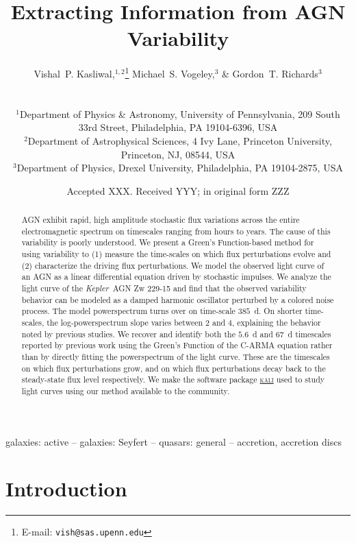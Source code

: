 \documentclass[a4paper,fleqn,usenatbib]{mnras}
\title[Extracting Information from AGN Variability]{Extracting Information from AGN Variability}
\author[V.~P. Kasliwal et al.]{
\parbox{\textwidth}{
Vishal~P. Kasliwal,$^{1,2}$\thanks{E-mail: \texttt{vish@sas.upenn.edu}}
Michael~S. Vogeley,$^{3}$
\& Gordon~T. Richards$^{3}$}\vspace{0.4cm}\
\\
\parbox{\textwidth}{
$^{1}$Department of Physics \& Astronomy, University of Pennsylvania, 209 South 33rd Street, Philadelphia, PA 19104-6396, USA\\
$^{2}$Department of Astrophysical Sciences, 4 Ivy Lane, Princeton University, Princeton, NJ, 08544, USA\\
$^{3}$Department of Physics, Drexel University, Philadelphia, PA 19104-2875, USA\\
}
}
\date{Accepted XXX. Received YYY; in original form ZZZ}
\newcommand{\Kepler}{\textit{Kepler~}}
\begin{document}
\label{firstpage}
\pagerange{\pageref{firstpage}--\pageref{lastpage}}
\maketitle

\begin{abstract}
AGN exhibit rapid, high amplitude stochastic flux variations across the entire electromagnetic spectrum on timescales ranging from hours to years. The cause of this variability is poorly understood. We present a Green's Function-based method for using variability to (1) measure the time-scales on which flux perturbations evolve and (2) characterize the driving flux perturbations. We model the observed light curve of an AGN as a linear differential equation driven by stochastic impulses. We analyze the light curve of the \Kepler AGN Zw 229-15 and find that the observed variability behavior can be modeled as a damped harmonic oscillator perturbed by a colored noise process. The model powerspectrum turns over on time-scale $385$~d. On shorter time-scales, the log-powerspectrum slope varies between $2$ and $4$, explaining the behavior noted by previous studies. We recover and identify both the $5.6$~d and $67$~d timescales reported by previous work using the Green's Function of the C-ARMA equation rather than by directly fitting the powerspectrum of the light curve. These are the timescales on which flux perturbations grow, and on which flux perturbations decay back to the steady-state flux level respectively. We make the software package \href{https://github.com/AstroVPK/kali}{\textsc{k\={a}l\={i}}} used to study light curves using our method available to the community.
\end{abstract}

\begin{keywords}
galaxies: active -- galaxies: Seyfert -- quasars: general -- accretion, accretion discs
\end{keywords}



\section[Introduction]{Introduction}\label{sec:Introduction}
\end{document}
